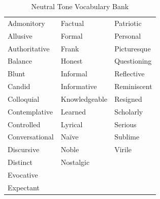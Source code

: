 \documentclass[a4paper]{article}
\begin{document}
\begin{longtable}{|p{2.5cm}|p{2.5cm}|p{2.5cm}|}
\caption{Neutral Tone Vocabulary Bank} \label{tab:neutraltonewords} \\
\hline
\hline
\endfirsthead

\hline
\hline
\endhead

\hline
\endfoot

Admonitory & Factual & Patriotic \\
Allusive & Formal & Personal \\
Authoritative & Frank & Picturesque \\
Balance & Honest & Questioning \\
Blunt & Informal & Reflective \\
Candid & Informative & Reminiscent \\
Colloquial & Knowledgeable & Resigned \\
Contemplative & Learned & Scholarly \\
Controlled & Lyrical & Serious \\
Conversational & Naïve & Sublime \\
Discursive & Noble & Virile \\
Distinct & Nostalgic & \\
Evocative &  & \\
Expectant &  & \\
\hline

\end{longtable}

\newpage
\end{document}
